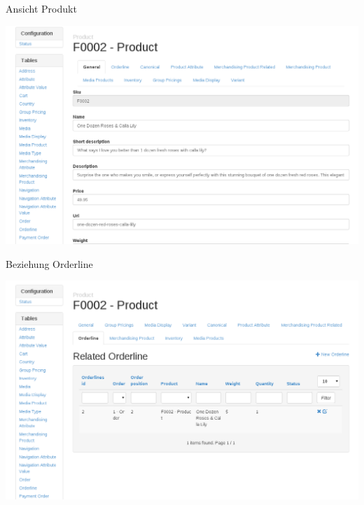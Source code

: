 \begin{frame}{Ansicht Produkt}
  \begin{center}
    \includegraphics[width=\textwidth,height=0.8\textheight,keepaspectratio]{images/product-detail.png}
  \end{center}
\end{frame}

\begin{frame}{Beziehung Orderline}
  \begin{center}
    \includegraphics[width=\textwidth,height=0.8\textheight,keepaspectratio]{images/product-related.png}
  \end{center}
\end{frame}


